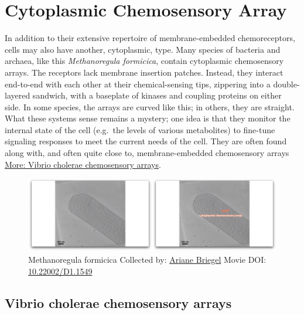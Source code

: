 \documentclass[]{tufte-book}
\begin{document}
\section{Cytoplasmic Chemosensory
Array}\label{cytoplasmic-chemosensory-array}

In addition to their extensive repertoire of membrane-embedded
chemoreceptors, cells may also have another, cytoplasmic, type. Many
species of bacteria and archaea, like this \emph{Methanoregula
formicica}, contain cytoplasmic chemosensory arrays. The receptors lack
membrane insertion patches. Instead, they interact end-to-end with each
other at their chemical-sensing tips, zippering into a double-layered
sandwich, with a baseplate of kinases and coupling proteins on either
side. In some species, the arrays are curved like this; in others, they
are straight. What these systems sense remains a mystery; one idea is
that they monitor the internal state of the cell (e.g.~the levels of
various metabolites) to fine-tune signaling responses to meet the
current needs of the cell. They are often found along with, and often
quite close to, membrane-embedded chemosensory arrays
\protect\hyperlink{Vibrio_cholerae_chemosensory_arrays}{More: Vibrio
cholerae chemosensory arrays}.





\begin{figure}
\includegraphics{movie_stills/7_5} \caption[Methanoregula formicica Collected by:
\protect\hyperlink{ariane_briegel}{Ariane Briegel} Movie DOI:
\href{https://doi.org/10.22002/D1.1549}{10.22002/D1.1549}]{Methanoregula formicica Collected by:
\protect\hyperlink{ariane_briegel}{Ariane Briegel} Movie DOI:
\href{https://doi.org/10.22002/D1.1549}{10.22002/D1.1549}}\label{fig:7-5}
\end{figure}

\hypertarget{Vibrio_cholerae_chemosensory_arrays}{\subsection{Vibrio
cholerae chemosensory
arrays}\label{Vibrio_cholerae_chemosensory_arrays}}
\end{document}

